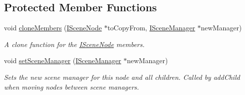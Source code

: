 \subsection*{Protected Member Functions}
\begin{DoxyCompactItemize}
\item 
void \hyperlink{classirr_1_1scene_1_1ISceneNode_a00a4ef0212b5d4b005202519859689bd}{clone\+Members} (\hyperlink{classirr_1_1scene_1_1ISceneNode}{I\+Scene\+Node} $\ast$to\+Copy\+From, \hyperlink{classirr_1_1scene_1_1ISceneManager}{I\+Scene\+Manager} $\ast$new\+Manager)
\begin{DoxyCompactList}\small\item\em A clone function for the \hyperlink{classirr_1_1scene_1_1ISceneNode}{I\+Scene\+Node} members. \end{DoxyCompactList}\item 
\mbox{\label{classirr_1_1scene_1_1ISceneNode_a513d09ae37f71391d7c4838e29164a3e}} 
void \hyperlink{classirr_1_1scene_1_1ISceneNode_a513d09ae37f71391d7c4838e29164a3e}{set\+Scene\+Manager} (\hyperlink{classirr_1_1scene_1_1ISceneManager}{I\+Scene\+Manager} $\ast$new\+Manager)
\begin{DoxyCompactList}\small\item\em Sets the new scene manager for this node and all children. Called by add\+Child when moving nodes between scene managers. \end{DoxyCompactList}\end{DoxyCompactItemize}
